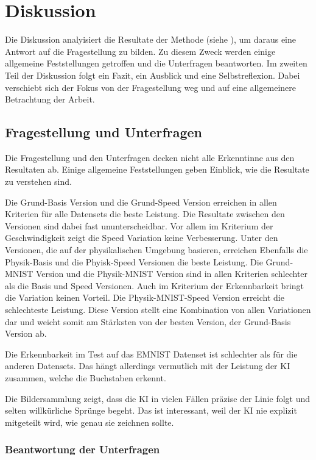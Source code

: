 \chapter{Diskussion}
Die Diskussion analyisiert die Resultate der Methode (siehe ),
um daraus eine Antwort auf die Fragestellung zu bilden. Zu diesem Zweck werden
einige allgemeine Feststellungen getroffen und die Unterfragen beantworten. Im
zweiten Teil der Diskussion folgt ein Fazit, ein Ausblick und eine
Selbstreflexion. Dabei verschiebt sich der Fokus von der Fragestellung weg und
auf eine allgemeinere Betrachtung der Arbeit.


\section{Fragestellung und Unterfragen}
Die Fragestellung und den Unterfragen decken nicht alle Erkenntinne aus den
Resultaten ab. Einige allgemeine Feststellungen geben Einblick, wie die
Resultate zu verstehen sind. 

Die Grund-Basis Version und die Grund-Speed Version erreichen in allen Kriterien
für alle Datensets die beste Leistung. Die Resultate zwischen den Versionen sind
dabei fast ununterscheidbar. Vor allem im Kriterium der Geschwindigkeit zeigt
die Speed Variation keine Verbesserung. Unter den Versionen, die auf der
physikalischen Umgebung basieren, erreichen Ebenfalls die Physik-Basis und die
Phyisk-Speed Versionen die beste Leistung. Die Grund-MNIST Version und die
Physik-MNIST Version sind in allen Kriterien schlechter als die Basis und Speed
Versionen. Auch im Kriterium der Erkennbarkeit bringt die Variation keinen
Vorteil. Die Physik-MNIST-Speed Version erreicht die schlechteste Leistung.
Diese Version stellt eine Kombination von allen Variationen dar und weicht somit
am Stärksten von der besten Version, der Grund-Basis Version ab.

Die Erkennbarkeit im Test auf das EMNIST Datenset ist schlechter als für die
anderen Datensets. Das hängt allerdings vermutlich mit der Leistung der KI
zusammen, welche die Buchstaben erkennt.

Die Bildersammlung zeigt, dass die KI in vielen Fällen präzise der Linie folgt
und selten willkürliche Sprünge begeht. Das ist interessant, weil der KI nie
explizit mitgeteilt wird, wie genau sie zeichnen sollte.


\subsection{Beantwortung der Unterfragen}
\label{sub:d_frage_unter}

